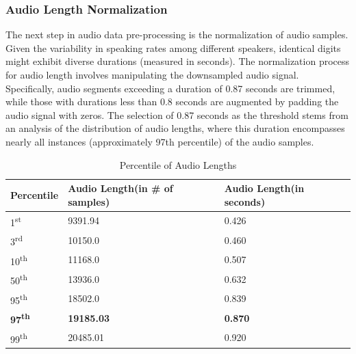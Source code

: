 \documentclass[12pt]{article}
\begin{document}
\subsubsection{Audio Length Normalization}
The next step in audio data pre-processing is the normalization of audio samples. Given the variability in speaking rates among different speakers, identical digits might exhibit diverse durations (measured in seconds). The normalization process for audio length involves manipulating the downsampled audio signal. Specifically, audio segments exceeding a duration of 0.87 seconds are trimmed, while those with durations less than 0.8 seconds are augmented by padding the audio signal with zeros. The selection of 0.87 seconds as the threshold stems from an analysis of the distribution of audio lengths, where this duration encompasses nearly all instances (approximately 97th percentile) of the audio samples.

\begin{table}[!h]
\centering
\caption{Percentile of Audio Lengths}
\label{tab:my_table}
\begin{tabular}{l|l|l}
\textbf{Percentile} &\textbf{ Audio Length(in \# of samples)} & \textbf{Audio Length(in seconds)} \\ \hline
1\textsuperscript{st} & 9391.94 & 0.426 \\
3\textsuperscript{rd} & 10150.0 & 0.460 \\
10\textsuperscript{th} & 11168.0 & 0.507 \\
50\textsuperscript{th} & 13936.0 & 0.632 \\
95\textsuperscript{th} & 18502.0 & 0.839 \\
\textbf{97}\textbf{\textsuperscript{th}} & \textbf{19185.03} & \textbf{0.870} \\
99\textsuperscript{th} & 20485.01 & 0.920 \\

\end{tabular}
\end{table}

\end{document}
